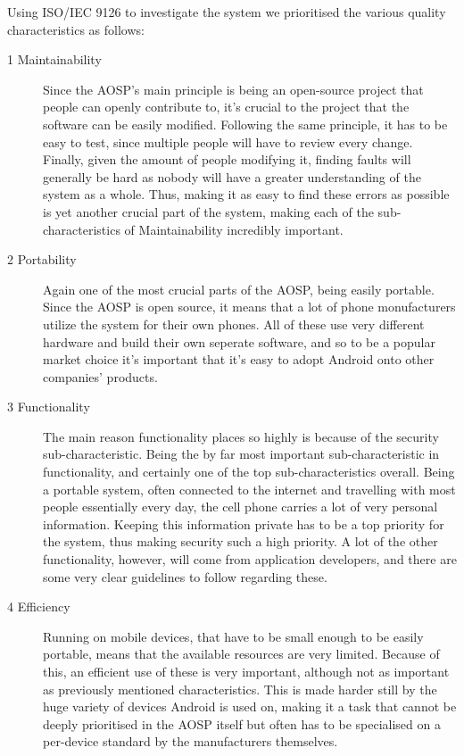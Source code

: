 \documentclass[conference]{IEEEtran}
\begin{document}
Using ISO/IEC 9126\cite{jung2004} to investigate the system we prioritised the various quality characteristics as follows: \\
    

\begin{description}
\item[1 Maintainability] Since the AOSP's main principle is being an open-source project that people can openly contribute to, it's crucial to the project that the software can be easily modified. Following the same principle, it has to be easy to test, since multiple people will have to review every change. Finally, given the amount of people modifying it, finding faults will generally be hard as nobody will have a greater understanding of the system as a whole. Thus, making it as easy to find these errors as possible is yet another crucial part of the system, making each of the sub-characteristics of Maintainability incredibly important. 
\item[2 Portability] Again one of the most crucial parts of the AOSP, being easily portable. Since the AOSP is open source, it means that a lot of phone monufacturers utilize the system for their own phones. All of these use very different hardware and build their own seperate software, and so to be a popular market choice it's important that it's easy to adopt Android onto other companies' products.
\item[3 Functionality] The main reason functionality places so highly is because of the security sub-characteristic. Being the by far most important sub-characteristic in functionality, and certainly one of the top sub-characteristics overall. Being a portable system, often connected to the internet and travelling with most people essentially every day, the cell phone carries a lot of very personal information. Keeping this information private has to be a top priority for the system, thus making security such a high priority. A lot of the other functionality, however, will come from application developers, and there are some very clear guidelines to follow regarding these.\cite{Android-quality}
\item[4 Efficiency]  Running on mobile devices, that have to be small enough to be easily portable, means that the available resources are very limited. Because of this, an efficient use of these is very important, although not as important as previously mentioned characteristics. This is made harder still by the huge variety of devices Android is used on, making it a task that cannot be deeply prioritised in the AOSP itself but often has to be specialised on a per-device standard by the manufacturers themselves. 

\end{description}
\end{document}
